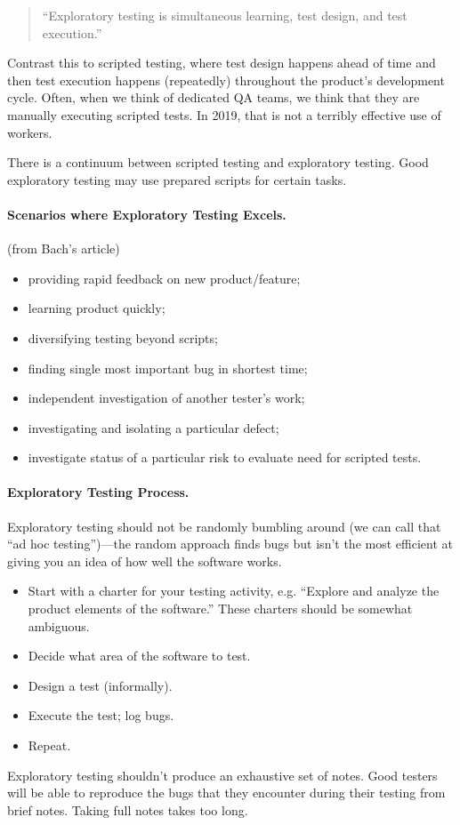 \documentclass[11pt]{article}
\begin{document}
\begin{quote}
``Exploratory testing is simultaneous learning, test design, and test execution.''
\end{quote}
Contrast this to scripted testing, where test design
happens ahead of time and then test execution happens (repeatedly)
throughout the product's development cycle. Often, when we think of
dedicated QA teams, we think that they are manually executing scripted
tests. In 2019, that is not a terribly effective use of workers.

There is a continuum between scripted testing and exploratory testing.
Good exploratory testing may use prepared scripts for certain tasks.

\newpage
\paragraph{Scenarios where Exploratory Testing Excels.} (from Bach's article)
\begin{itemize}[noitemsep]
\item providing rapid feedback on new product/feature;
\item learning product quickly;
\item diversifying testing beyond scripts;
\item finding single most important bug in shortest time;
\item independent investigation of another tester's work;
\item investigating and isolating a particular defect;
\item investigate status of a particular risk to evaluate need for scripted tests.
\end{itemize}

\paragraph{Exploratory Testing Process.} Exploratory testing should not be
randomly bumbling around (we can call that ``ad hoc testing'')---the random
approach finds bugs but isn't the most efficient at giving you an idea of how well
the software works.

\begin{itemize}[noitemsep]
\item Start with a charter for your testing activity, e.g. ``Explore and analyze the product elements of the software.'' 
These charters should be somewhat ambiguous.
\item Decide what area of the software to test.
\item Design a test (informally).
\item Execute the test; log bugs.
\item Repeat.
\end{itemize}
Exploratory testing shouldn't produce an exhaustive set of notes. Good testers will
be able to reproduce the bugs that they encounter during their testing from brief notes.
Taking full notes takes too long.
\end{document}
